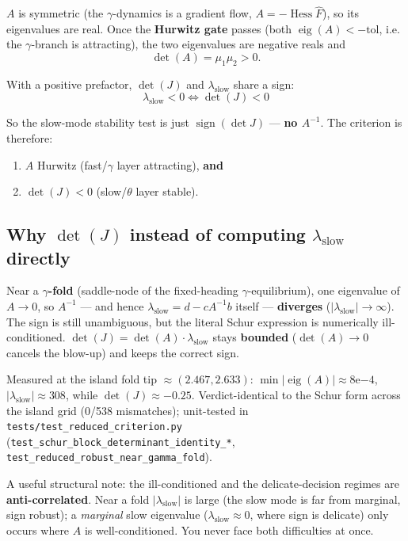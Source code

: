 \documentclass[11pt]{article}
\DeclareMathOperator{\sign}{sign}
\DeclareMathOperator{\eig}{eig}
\DeclareMathOperator{\Hess}{Hess}
\begin{document}
$A$ is symmetric (the $\gamma$-dynamics is a gradient flow,
$A = -\Hess \hat F$), so its eigenvalues are real. Once the \textbf{Hurwitz
gate} passes (both $\eig(A) < -\mathrm{tol}$, i.e. the $\gamma$-branch is
attracting), the two eigenvalues are negative reals and
\[
\det(A) = \mu_1 \mu_2 > 0.
\]

With a positive prefactor, $\det(J)$ and $\lambda_{\text{slow}}$ share a sign:
\[
\boxed{\;\lambda_{\text{slow}} < 0 \iff \det(J) < 0\;}
\]

So the slow-mode stability test is just $\sign(\det J)$ --- \textbf{no
$A^{-1}$}. The criterion is therefore:
\begin{enumerate}
  \item $A$ Hurwitz (fast/$\gamma$ layer attracting), \textbf{and}
  \item $\det(J) < 0$ (slow/$\theta$ layer stable).
\end{enumerate}

\subsection{Why $\det(J)$ instead of computing $\lambda_{\text{slow}}$ directly}

Near a \textbf{$\gamma$-fold} (saddle-node of the fixed-heading
$\gamma$-equilibrium), one eigenvalue of $A \to 0$, so $A^{-1}$ --- and hence
$\lambda_{\text{slow}} = d - cA^{-1}b$ itself --- \textbf{diverges}
($|\lambda_{\text{slow}}| \to \infty$). The sign is still unambiguous, but the
literal Schur expression is numerically ill-conditioned.
$\det(J) = \det(A)\cdot\lambda_{\text{slow}}$ stays \textbf{bounded}
($\det(A) \to 0$ cancels the blow-up) and keeps the correct sign.

Measured at the island fold tip $\approx(2.467, 2.633)$:
$\min|\eig(A)| \approx 8\mathrm{e}{-4}$, $|\lambda_{\text{slow}}| \approx 308$,
while $\det(J) \approx -0.25$. Verdict-identical to the Schur form across the
island grid (0/538 mismatches); unit-tested in
\texttt{tests/test\_reduced\_criterion.py}
(\texttt{test\_schur\_block\_determinant\_identity\_*},
\texttt{test\_reduced\_robust\_near\_gamma\_fold}).

A useful structural note: the ill-conditioned and the delicate-decision
regimes are \textbf{anti-correlated}. Near a fold $|\lambda_{\text{slow}}|$ is
large (the slow mode is far from marginal, sign robust); a \emph{marginal}
slow eigenvalue ($\lambda_{\text{slow}} \approx 0$, where sign is delicate)
only occurs where $A$ is well-conditioned. You never face both difficulties at
once.
\end{document}
